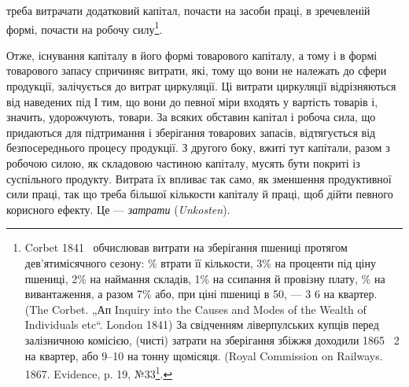 \parcont{}  %
треба витрачати додатковий капітал, почасти на засоби праці, в зречевленій
формі, почасти на робочу силу\footnote{
Corbet 1841~ обчислював витрати на зберігання пшениці протягом дев'ятимісячного
сезону: \% втрати її кількости, 3\% на проценти під ціну пшениці,
2\% на наймання складів, 1\% на ссипання й провізну плату, \% на вивантаження,
а разом 7\% або, при ціні пшениці в 50, — 3 6 на
квартер. (The Corbet. „Ап Inquiry into the Causes and Modes of the Wealth of
Individuals etc“. London 1841) За свідченням ліверпулських купців перед залізничною
комісією, (чисті) затрати на зберігання збіжжя доходили 1865~ 2
на квартер, або 9--10 на тонну щомісяця. (Royal Commission on Railways.
1867. Evidence, p. 19, №33\footnote*{
Точна назва цього видання така: „Reports from commissioners Session“,
1867, vol. XXXVIII; зазначене місце є в другому відділі першої частини, що має
назву: „Royal Commission on Railways. Minutes of Evidence taken before the commissioners
March 1855 to Mev 1866. Presented to both Houses of Parlament by
command of her Majesty“. London, printed 1867. \emph{Ред.}}.
}.

Отже, існування капіталу в його формі товарового капіталу, а тому
і в формі товарового запасу спричиняє витрати, які, тому що вони не належать
до сфери продукції, залічується до витрат циркуляції. Ці витрати
циркуляції відрізняються від наведених під І тим, що вони до певної
міри входять у вартість товарів і, значить, удорожчують, товари. За всяких
обставин капітал і робоча сила, що придаються для підтримання і
зберігання товарових запасів, відтягується від безпосереднього процесу
продукції. З другого боку, вжиті тут капітали, разом з робочою силою,
як складовою частиною капіталу, мусять бути покриті із суспільного
продукту. Витрата їх впливає так само, як зменшення продуктивної сили
праці, так що треба більшої кількости капіталу й праці, щоб дійти певного
корисного ефекту. Це — \emph{затрати} (\emph{Unkosten}).


